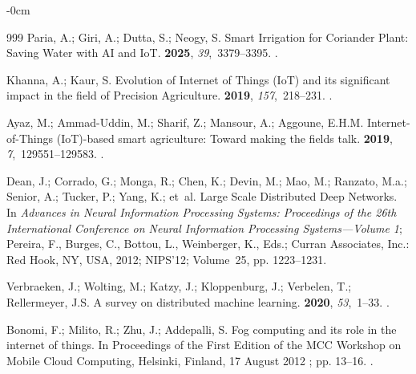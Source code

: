 \documentclass[land,review,accept,pdftex,oneauthor]{Definitions/mdpi}
\begin{document}
\begin{adjustwidth}{-\extralength}{0cm}
\begin{thebibliography}{999}
Paria, A.; Giri, A.; Dutta, S.; Neogy, S.
\newblock Smart Irrigation for Coriander Plant: Saving Water with AI and IoT.
 {\bf 2025}, {\em 39},~3379--3395.
.

Khanna, A.; Kaur, S.
\newblock Evolution of Internet of Things (IoT) and its significant impact in
  the field of Precision Agriculture.
 {\bf 2019}, {\em
  157},~218--231.
.

Ayaz, M.; Ammad-Uddin, M.; Sharif, Z.; Mansour, A.; Aggoune, E.H.M.
\newblock Internet-of-Things (IoT)-based smart agriculture: Toward making the
  fields talk.
 {\bf 2019}, {\em 7},~129551--129583.
.

Dean, J.; Corrado, G.; Monga, R.; Chen, K.; Devin, M.; Mao, M.; Ranzato, M.a.;
  Senior, A.; Tucker, P.; Yang, K.;  et~al.
\newblock Large Scale Distributed Deep Networks.
\newblock In \emph{Advances in Neural Information Processing
  Systems: Proceedings of the 26th International Conference on Neural
  Information Processing Systems---Volume 1}; Pereira, F., Burges, C., Bottou, L., Weinberger, K., Eds.; Curran
  Associates, Inc.: Red Hook, NY, USA,  %
 2012;  NIPS'12; Volume~25,  pp. 1223--1231.
\newblock 

Verbraeken, J.; Wolting, M.; Katzy, J.; Kloppenburg, J.; Verbelen, T.;
  Rellermeyer, J.S.
\newblock A survey on distributed machine learning.
 {\bf 2020}, {\em 53},~1--33.
.

Bonomi, F.; Milito, R.; Zhu, J.; Addepalli, S.
\newblock Fog computing and its role in the internet of things.
\newblock In Proceedings of the First Edition of the MCC Workshop on Mobile
  Cloud Computing, Helsinki, Finland, 17 August  2012 %
; pp. 13--16.
.


\end{thebibliography}
\end{adjustwidth}
\end{document}
